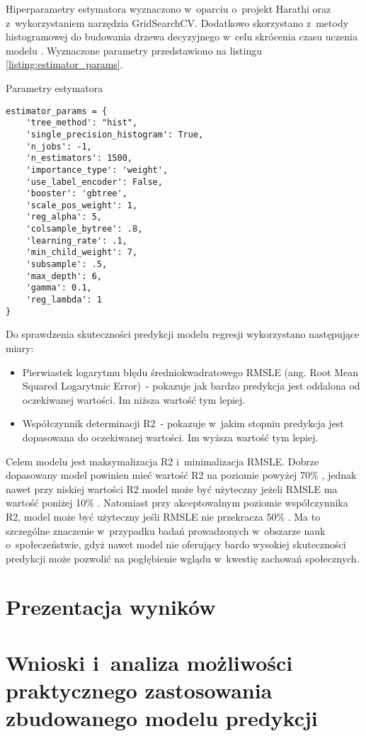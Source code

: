 Hiperparametry estymatora wyznaczono w~oparciu o~projekt Harathi \cite{harathi-2018} oraz z~wykorzystaniem narzędzia GridSearchCV.
Dodatkowo skorzystano z~metody histogramowej do budowania drzewa decyzyjnego w~celu skrócenia czasu uczenia modelu \cite{golarnyk-2021}.
Wyznaczone parametry przedstawiono na listingu \ref{listing:estimator_params}.

\begin{listing}[h!]
    \caption{Parametry estymatora} \label{listing:estimator_params}
    \begin{verbatim}
estimator_params = {
    'tree_method': "hist",
    'single_precision_histogram': True,
    'n_jobs': -1,
    'n_estimators': 1500,
    'importance_type': 'weight',
    'use_label_encoder': False,
    'booster': 'gbtree',
    'scale_pos_weight': 1,
    'reg_alpha': 5,
    'colsample_bytree': .8,
    'learning_rate': .1,
    'min_child_weight': 7,
    'subsample': .5,
    'max_depth': 6,
    'gamma': 0.1,
    'reg_lambda': 1
}
    \end{verbatim}
    \raggedright\source{\ownwork}
\end{listing}

Do sprawdzenia skuteczności predykcji modelu regresji wykorzystano następujące miary:
\begin{itemize}
    \item Pierwiastek logarytmu błędu średniokwadratowego RMSLE (ang. Root Mean Squared Logarytmic Error)~- pokazuje jak bardzo predykcja jest oddalona od oczekiwanej wartości. Im niższa wartość tym lepiej.
    \item Współczynnik determinacji R2~- pokazuje w~jakim stopniu predykcja jest dopasowana do oczekiwanej wartości. Im wyższa wartość tym lepiej.
    \end{itemize}

Celem modelu jest maksymalizacja R2 i~minimalizacja RMSLE. Dobrze dopasowany model powinien mieć wartość R2 na poziomie powyżej 70\% \cite{r2-good-value}, jednak nawet przy niskiej wartości R2 model może być użyteczny jeżeli RMSLE ma wartość poniżej 10\% \cite{r2-vs-rmse}.
Natomiast przy akceptowalnym poziomie współczynnika R2, model może być użyteczny jeśli RMSLE nie przekracza 50\% \cite{rmse-good-value}.
Ma to szczególne znaczenie w~przypadku badań prowadzonych w~obszarze nauk o~społeczeństwie, gdyż nawet model nie oferujący bardo wysokiej skuteczności predykcji może pozwolić na pogłębienie wglądu w~kwestię zachowań społecznych.

\section{Prezentacja wyników}\label{sec:analysis:important-features}
\todo{}
\section{Wnioski i~analiza możliwości praktycznego zastosowania zbudowanego modelu predykcji}\label{sec:analysis:model-fitness}

\thispagestyle{normal}
